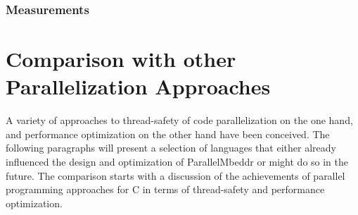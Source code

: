 \subsubsection{Measurements}

\section{Comparison with other Parallelization Approaches}
A variety of approaches to thread-safety of code parallelization on the one hand, and performance optimization on the other hand have been conceived. The following paragraphs will present a selection of languages that either already influenced the design and optimization of ParallelMbeddr or might do so in the future. The comparison starts with a discussion of the achievements of parallel programming approaches for C in terms of thread-safety and performance optimization. 


